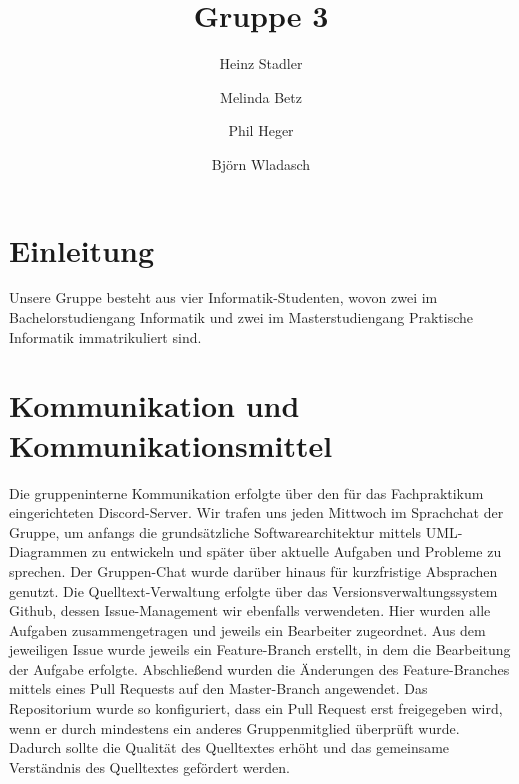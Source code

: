 \documentclass[runningheads]{llncs}
\begin{document}
%
\title{Gruppe 3}
%
%
\author{Heinz Stadler\and
Melinda Betz\and
Phil Heger\and
Björn Wladasch}
%
%
%
\maketitle              %
%
%
\section{Einleitung}
Unsere Gruppe besteht aus vier Informatik-Studenten, wovon zwei im Bachelorstudiengang Informatik und zwei im Masterstudiengang Praktische Informatik immatrikuliert sind.

\section{Kommunikation und Kommunikationsmittel}
Die gruppeninterne Kommunikation erfolgte über den für das Fachpraktikum eingerichteten Discord-Server. Wir trafen uns jeden Mittwoch im Sprachchat der Gruppe, um anfangs die grundsätzliche Softwarearchitektur mittels UML-Diagrammen zu entwickeln und später über aktuelle Aufgaben und Probleme zu sprechen. Der Gruppen-Chat wurde darüber hinaus für kurzfristige Absprachen genutzt.
Die Quelltext-Verwaltung erfolgte über das Versionsverwaltungssystem Github, dessen Issue-Management wir ebenfalls verwendeten. Hier wurden alle Aufgaben zusammengetragen und jeweils ein Bearbeiter zugeordnet. Aus dem jeweiligen Issue wurde jeweils ein Feature-Branch erstellt, in dem die Bearbeitung der Aufgabe erfolgte. Abschließend wurden die Änderungen des Feature-Branches mittels eines Pull Requests auf den Master-Branch angewendet. Das Repositorium wurde so konfiguriert, dass ein Pull Request erst freigegeben wird, wenn er durch mindestens ein anderes Gruppenmitglied überprüft wurde. Dadurch sollte die Qualität des Quelltextes erhöht und das gemeinsame Verständnis des Quelltextes gefördert werden.
\end{document}
